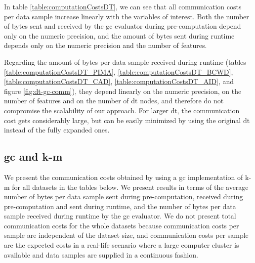 In table \ref{table:computationCostsDT}, we can see that all communication costs per data sample increase linearly with the variables of interest. Both the number of bytes sent and received by the \ac{gc} evaluator during pre-computation depend only on the numeric precision, and the amount of bytes sent during runtime depends only on the numeric precision and the number of features.

Regarding the amount of bytes per data sample received during runtime (tables \ref{table:computationCostsDT_PIMA}, \ref{table:computationCostsDT_BCWD}, \ref{table:computationCostsDT_CAD}, \ref{table:computationCostsDT_AID}, and figure \ref{fig:dt-gc-comm}), they depend linearly on the numeric precision, on the number of features and on the number of \ac{dt} nodes, and therefore do not compromise the scalability of our approach. For larger \ac{dt}, the communication cost gets considerably large, but can be easily minimized by using the original \ac{dt} instead of the fully expanded ones.




\subsection{\acl{gc} and \acl{k-m}}

We present the communication costs obtained by using a \ac{gc} implementation of \ac{k-m} for all datasets in the tables below. We present results in terms of the average number of bytes per data sample sent during pre-computation, received during pre-computation and sent during runtime, and the number of bytes per data sample received during runtime by the \ac{gc} evaluator. We do not present total communication costs for the whole datasets because communication costs per sample are independent of the dataset size, and communication costs per sample are the expected costs in a real-life scenario where a large computer cluster is available and data samples are supplied in a continuous fashion.


